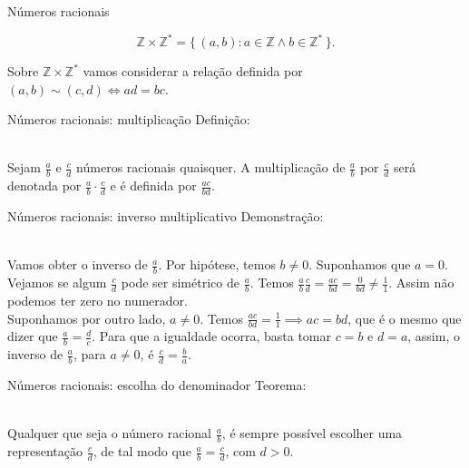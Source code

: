 \documentclass[xcolor=dvipsnames]{beamer}
\begin{document}
\begin{frame}{Números racionais}

    \[ \mathbb{Z} \times \mathbb{Z}^* = \{\, \left( a,b \right) : a \in \mathbb{Z} \land b \in \mathbb{Z}^* \,\}. \]

    Sobre $\mathbb{Z} \times \mathbb{Z}^*$ vamos considerar a relação definida por $\left( a,b \right) \sim \left( c,d \right) \iff ad = bc$.
\end{frame}

\begin{frame}{Números racionais: multiplicação}
    Definição: \\~\
    
    Sejam $\frac{a}{b}$ e $\frac{c}{d}$ números racionais quaisquer. A multiplicação de $\frac{a}{b}$ por $\frac{c}{d}$ será denotada por $\frac{a}{b} \cdot \frac{c}{d}$ e é definida por $\frac{ac}{bd}$.
\end{frame}

\begin{frame}{Números racionais: inverso multiplicativo}
    Demonstração: \\~\
    
    Vamos obter o inverso de $\frac{a}{b}$. Por hipótese, temos $b \neq 0$. Suponhamos que $a=0$. Vejamos se algum $\frac{c}{d}$
        pode ser simétrico de $\frac{a}{b}$. Temos $\frac{a}{b} \frac{c}{d} = \frac{ac}{bd} = \frac{0}{bd} \neq \frac{1}{1}$. Assim não podemos ter zero no numerador. \\
        Suponhamos por outro lado, $a \neq 0$. Temos $\frac{ac}{bd} = \frac{1}{1} \implies ac = bd$, que é o mesmo que dizer que $\frac{a}{b} = \frac{d}{c}$. Para que a igualdade ocorra, basta tomar $c=b$ e $d=a$, assim, o inverso de $\frac{a}{b}$, para $a \neq 0$, é $\frac{c}{d} = \frac{b}{a}$.
\end{frame}

\begin{frame}{Números racionais: escolha do denominador}
    Teorema: \\~\
    
    Qualquer que seja o número racional $\frac{a}{b}$, é sempre possível escolher uma representação $\frac{c}{d}$, de tal modo que $\frac{a}{b} = \frac{c}{d}$, com $d > 0$.
\end{frame}
\end{document}
